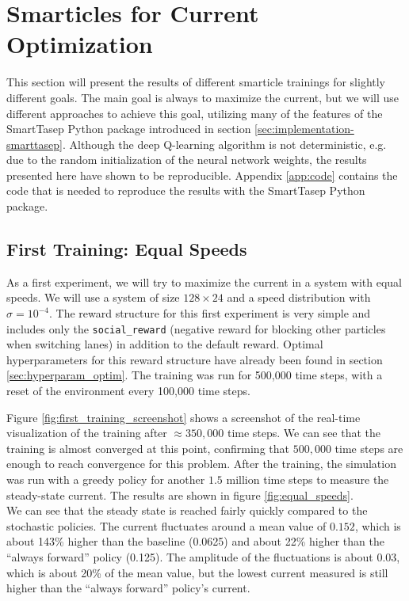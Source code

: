 \section{Smarticles for Current Optimization}
\label{sec:smarticle_current_optimization}
This section will present the results of different smarticle trainings for slightly different goals. The main goal is always to maximize the current, but we will use different approaches to achieve this goal, utilizing many of the features of the SmartTasep Python package introduced in section \ref{sec:implementation-smarttasep}. Although the deep Q-learning algorithm is not deterministic, e.g. due to the random initialization of the neural network weights, the results presented here have shown to be reproducible. Appendix \ref{app:code} contains the code that is needed to reproduce the results with the SmartTasep Python package.

\subsection{First Training: Equal Speeds}
As a first experiment, we will try to maximize the current in a system with equal speeds. We will use a system of size $128 \times 24$ and a speed distribution with $\sigma=10^{-4}$. The reward structure for this first experiment is very simple and includes only the \texttt{social\_reward} (negative reward for blocking other particles when switching lanes) in addition to the default reward. Optimal hyperparameters for this reward structure have already been found in section \ref{sec:hyperparam_optim}. The training was run for 500,000 time steps, with a reset of the environment every 100,000 time steps.


Figure \ref{fig:first_training_screenshot} shows a screenshot of the real-time visualization of the training after $\approx 350,000$ time steps. We can see that the training is almost converged at this point, confirming that $500,000$ time steps are enough to reach convergence for this problem. After the training, the simulation was run with a greedy policy for another $1.5$ million time steps to measure the steady-state current. The results are shown in figure \ref{fig:equal_speeds}. 
\\
We can see that the steady state is reached fairly quickly compared to the stochastic policies. The current fluctuates around a mean value of $0.152$, which is about 143\% higher than the baseline (0.0625) and about 22\% higher than the \enquote{always forward} policy (0.125). The amplitude of the fluctuations is about $0.03$, which is about 20\% of the mean value, but the lowest current measured is still higher than the \enquote{always forward} policy's current. 


